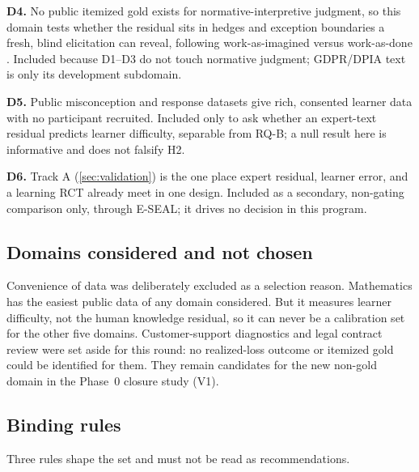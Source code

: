 \textbf{D4.} No public itemized gold exists for normative-interpretive judgment, so this domain
tests whether the residual sits in hedges and exception boundaries a fresh, blind elicitation can
reveal, following work-as-imagined versus work-as-done \evlit{} \parencite{hollnagel2018safety}.
Included because D1--D3 do not touch normative judgment; GDPR/DPIA text is only its development
subdomain.

\textbf{D5.} Public misconception and response datasets give rich, consented learner data with no
participant recruited. Included only to ask whether an expert-text residual predicts learner
difficulty, separable from RQ-B; a null result here is informative and does not falsify H2.

\textbf{D6.} Track A (\cref{sec:validation}) is the one place expert residual, learner error, and a
learning RCT already meet in one design. Included as a secondary, non-gating comparison only,
through E-SEAL; it drives no decision in this program.

\subsection{Domains considered and not chosen}

Convenience of data was deliberately excluded as a selection reason. Mathematics has the easiest
public data of any domain considered. But it measures learner difficulty, not the human knowledge
residual, so it can never be a calibration set for the other five domains. Customer-support
diagnostics and legal contract review were set aside for this round: no realized-loss outcome or
itemized gold could be identified for them. They remain candidates for the new non-gold domain in
the Phase~0 closure study (V1).

\subsection{Binding rules}

Three rules shape the set and must not be read as recommendations.

